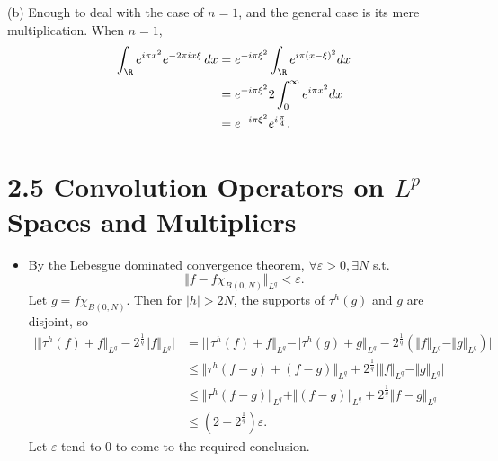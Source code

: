 \begin{itemize}
(b) Enough to deal with the case of $n=1$, 
and the general case is its mere multiplication. When $n=1$,
\begin{align*}
    \int_{\R}e^{i\pi x^2}e^{-2\pi ix\xi}\,dx
&=e^{-i\pi\xi^2}\int_{\R}e^{i\pi(x-\xi)^2}dx\\
&=e^{-i\pi\xi^2}2\int_0^\infty e^{i\pi x^2}dx\\
&=e^{-i\pi\xi^2}e^{i\frac{\pi}{4}}.
\end{align*}
\end{itemize}

\section*{2.5 Convolution Operators on $L^p$ Spaces and Multipliers}

\begin{itemize}
\item[2.5.1]
By the Lebesgue dominated convergence theorem, $\forall \varepsilon >0,\exists N$ 
s.t. $$\Vert f-f\chi_{B(0,N)}\Vert_{L^q}<\varepsilon.$$
Let $g=f\chi_{B(0,N)}$. Then for $\vert h\vert >2N$, 
the supports of $\tau^h(g)$ and $g$ are disjoint, so
\begin{align*}
\big\vert\Vert \tau^h(f) + f\Vert_{L^q}-2^{\frac1q}\Vert f\Vert_{L^q}\big\vert
&=\big\vert\Vert \tau^h(f) + f\Vert_{L^q}-\Vert \tau^h(g) 
+ g\Vert_{L^q}-2^{\frac1q}(\Vert f\Vert_{L^q}-\Vert g\Vert_{L^q})\big\vert \\
&\leq \Vert \tau^h(f-g) + (f-g)\Vert_{L^q} 
+ 2^{\frac{1}{q}}\big\vert \Vert f\Vert_{L^q} - \Vert g\Vert_{L^q} \big\vert \\
&\leq \Vert \tau^h(f-g) \Vert_{L^q} + \Vert (f-g)\Vert_{L^q} 
+ 2^{\frac{1}{q}} \Vert f - g\Vert_{L^q}\\
&\leq (2+2^{\frac1q})\varepsilon.
\end{align*}
Let $\varepsilon$ tend to $0$ to come to the required conclusion.


\end{itemize}
